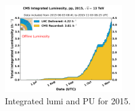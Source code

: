 \begin{figure}[h]
 \begin{center}
  \includegraphics[width=0.45\textwidth]{chapters/Chapter2-CMSatLHC/Figures/int_lumi_per_day_cumulative_pp_2015.png}
 \end{center}
 \caption{Integrated lumi and PU for 2015.}
 \label{fig:LHCRun2}
\end{figure}

 \clearpage